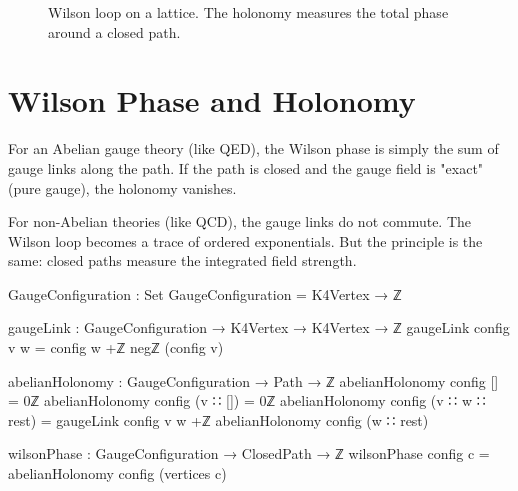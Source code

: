 \documentclass[11pt,a4paper]{book}
\begin{document}
\begin{figure}[h]
\centering
{}
\caption{Wilson loop on a lattice. The holonomy measures the total phase around a closed path.}
\label{fig:wilson-loop}
\end{figure}

\section{Wilson Phase and Holonomy}

For an Abelian gauge theory (like QED), the Wilson phase is simply the sum of gauge links along the path.
If the path is closed and the gauge field is "exact" (pure gauge), the holonomy vanishes.

For non-Abelian theories (like QCD), the gauge links do not commute. The Wilson loop becomes a trace of ordered exponentials. But the principle is the same: closed paths measure the integrated field strength.

\begin{code}
GaugeConfiguration : Set
GaugeConfiguration = K4Vertex → ℤ

gaugeLink : GaugeConfiguration → K4Vertex → K4Vertex → ℤ
gaugeLink config v w = config w +ℤ negℤ (config v)

abelianHolonomy : GaugeConfiguration → Path → ℤ
abelianHolonomy config [] = 0ℤ
abelianHolonomy config (v ∷ []) = 0ℤ
abelianHolonomy config (v ∷ w ∷ rest) = 
  gaugeLink config v w +ℤ abelianHolonomy config (w ∷ rest)

wilsonPhase : GaugeConfiguration → ClosedPath → ℤ
wilsonPhase config c = abelianHolonomy config (vertices c)
\end{code}
\end{document}
